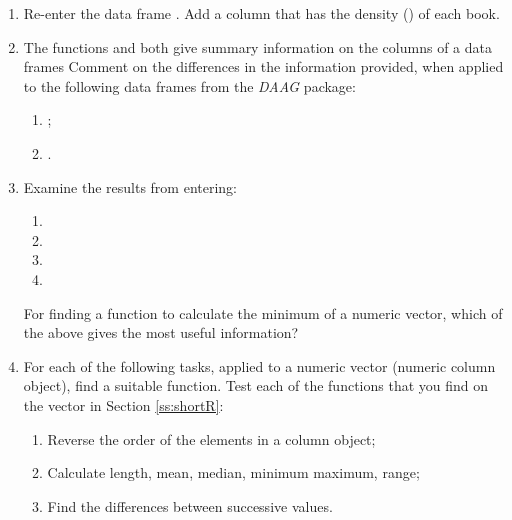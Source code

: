 \begin{enumerate}
\begin{enumerate}
\end{enumerate}
\item Re-enter the data frame .
    Add a column that has the density () of each book.
\item The functions  and  both give summary
  information on the columns of a data frames Comment on the differences
  in the information provided, when applied to the following data frames
  from the {\em DAAG} package:
  \begin{enumerate}
    \item {};
    \item {}.
  \end{enumerate}
\item Examine the results from entering:
  \begin{enumerate}
    \item {}
    \item {}
    \item {}
    \item {}
  \end{enumerate}
For finding a function to calculate the minimum of a numeric vector,
which of the above gives the most useful information?
\item For each of the following tasks, applied to a numeric vector
  (numeric column object), find a suitable function.  Test each of
  the functions that you find on the vector
   in Section \ref{ss:shortR}:\\
  \begin{enumerate}
    \item Reverse the order of the elements in a column object;
    \item Calculate length, mean, median, minimum maximum, range;
    \item Find the differences between successive values.
  \end{enumerate}
\end{enumerate}


